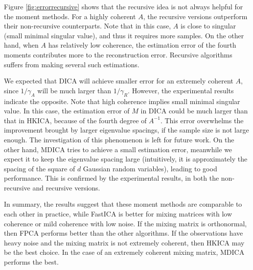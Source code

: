 \documentclass[11pt]{article}
\begin{document}
Figure \ref{fig:errorrecursive} shows that the recursive idea is not always helpful for the moment methods. For a highly coherent $A$, the recursive versions outperform their non-recursive counterparts.
Note that in this case, $A$ is close to singular (small minimal
singular value), and thus it requires more samples.
On the other hand, when $A$ has relatively low coherence,  the estimation error of the fourth moments contributes more to the reconstruction error. 
Recursive algorithms suffers from making several such estimations.

We expected that DICA will achieve smaller error for an extremely coherent $A$, since $1/\gamma_A$ will be much larger than $1/\gamma_R$. 
However, the experimental results indicate the opposite. 
Note that high coherence implies small minimal singular value.
In this case, the estimation error of $M$ in DICA could be much larger than that in HKICA, because of the fourth degree of $A^{-1}$.
This error overwhelms the improvement brought by larger eigenvalue
spacings, if the sample size is not large enough.
The investigation of this phenomenon is left for future work.
On the other hand, MDICA tries to achieve a small estimation error, meanwhile we expect it to keep the eigenvalue spacing large
(intuitively, it is approximately the spacing of the square of $d$ Gaussian random variables), leading to good performance.
This is confirmed by the experimental results, in both the non-recursive and recursive versions.

In summary, the results suggest that these moment methods are comparable to each other in practice,
while FastICA  is better for mixing matrices with low coherence or mild coherence with low noise.
If the mixing matrix is orthonormal, then FPCA performs better than
the other algorithms.
If the observations have heavy noise and the mixing matrix is not extremely coherent, then HKICA may be the best choice.
In the case of an extremely coherent mixing matrix, MDICA performs the
best. 
\end{document}
